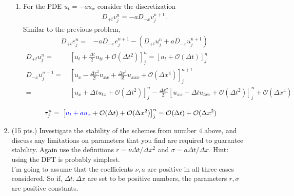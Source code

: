 \documentclass[11pt]{article}
\newcommand{\Dpt}{D_{+t}}
\newcommand{\Dmx}{D_{-x}}
\newcommand{\Oc}{\mathcal{O}}
\newcommand{\dx}{\Delta x}
\newcommand{\dt}{\Delta t}
\newcommand{\texp}[3]{\left[#1\right]^{#2}_{#3}}
\newcommand{\ux}{u_x}
\newcommand{\uxx}{u_{xx}}
\newcommand{\uxxx}{u_{xxx}}
\newcommand{\ut}{u_t}
\newcommand{\enj}{e^{n}_{j}}
\newcommand{\enpj}{e^{n+1}_{j}}
\newcommand{\unj}{u^{n}_{j}}
\newcommand{\unpj}{u^{n+1}_{j}}
\begin{document}
\begin{enumerate}
\begin{enumerate}
      \item{ \color{blue}For the PDE }$u_t= -au_x${ \color{blue}consider the discretization}
        \begin{align*}
          \Dpt v_j^n = -a\Dmx v_j^{n+1}.
        \end{align*}
        Similar to the previous problem, 
        \begin{align*}
        \Dpt\enj = & -a\Dmx \enpj -\left( \Dpt\unj + a\Dmx\unpj \right)
        \end{align*}
        \begin{align*}
        \Dpt \unj = & \  \texp{\ut + \frac{\dt}{2}u_{tt} + \Oc(\dt^2)}{n}{j} = \texp{\ut + \Oc(\dt)}{n}{j}\\
        \Dmx\unpj = & \ \texp{\ux - \frac{\dx^2}{2!}\uxx + \frac{\dx^3}{3!}\uxxx + \Oc(\dx^4)}{n+1}{j}\\
        = & \ \texp{\ux + \dt u_{tx} + \Oc(\dt^2)}{n}{j} - \frac{\dx^2}{2!}\texp{\uxx + \dt u_{txx} + \Oc(\dt^2)}{n}{j}+ \Oc(\dx^4)\\
        \end{align*}
        \begin{align*}
        \tau^{n}_{j} = & \ \texp{{\color{blue}\ut + a\ux} + \Oc(\dt) + \Oc(\dx^2)}{n}{j} = \Oc(\dt) + \Oc(\dx^2)
        \end{align*}
    \end{enumerate}   
  \item (15 pts.){\color{red} Investigate the stability of the schemes from number 4 above, and discuss any limitations on parameters that you find are required to guarantee stability. Again use the definitions }$r=\nu\dt/\dx^2$ {\color{red}and} $\sigma=a\dt/\dx${\color{red}. Hint: using the DFT is probably simplest.} \\
  
  I'm going to assume that the coefficients $\nu,a$ are positive in all three cases considered. So if, $\dt,\dx$ are set to be positive numbers, the parameters $r,\sigma$ are positive constants.
  

\end{enumerate}
\end{document}
